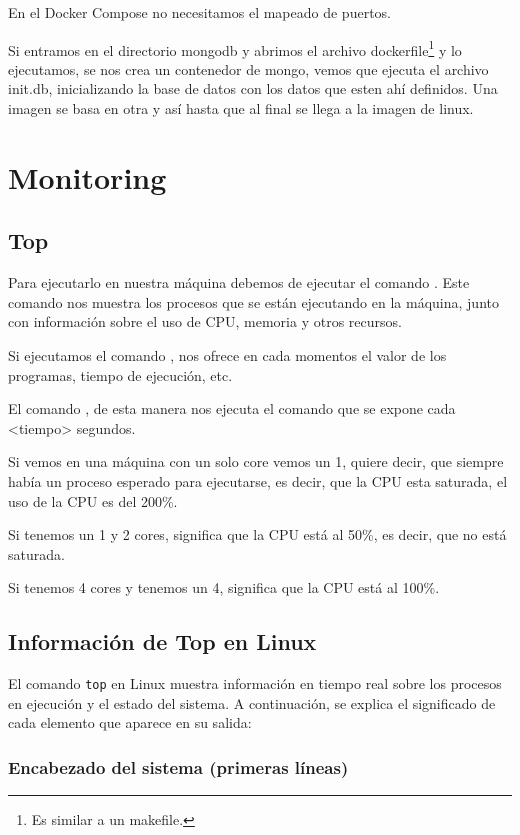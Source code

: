 En el Docker Compose no necesitamos el mapeado de puertos. 

Si entramos en el directorio mongodb y abrimos el archivo dockerfile\footnote{Es similar a un makefile.} y lo ejecutamos, se nos crea un contenedor de mongo, vemos que ejecuta el archivo init.db, inicializando la base de datos con los datos que esten ahí definidos. Una imagen se basa en otra y así hasta que al final se llega a la imagen de linux.  


\section{Monitoring}

\subsection*{Top}

Para ejecutarlo en nuestra máquina debemos de ejecutar el comando . Este comando nos muestra los procesos que se están ejecutando en la máquina, junto con información sobre el uso de CPU, memoria y otros recursos.

Si ejecutamos el comando , nos ofrece en cada momentos el valor de los programas, tiempo de ejecución, etc.

El comando , de esta manera nos ejecuta el comando que se expone cada <tiempo> segundos.

Si vemos en una máquina con un solo core vemos un 1, quiere decir, que siempre había un proceso esperado para ejecutarse, es decir, que la CPU esta saturada, el uso de la CPU es del 200\%.

Si tenemos un 1 y 2 cores, significa que la CPU está al 50\%, es decir, que no está saturada.

Si tenemos 4 cores y tenemos un 4, significa que la CPU está al 100\%.

\subsection*{Información de Top en Linux}

El comando \texttt{top} en Linux muestra información en tiempo real sobre los procesos en ejecución y el estado del sistema. A continuación, se explica el significado de cada elemento que aparece en su salida:

\subsubsection*{Encabezado del sistema (primeras líneas)}


